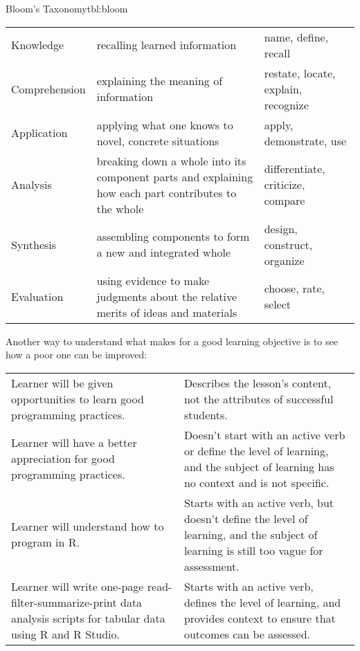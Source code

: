 \begin{tbllbl}{Bloom's Taxonomy}{tbl:bloom}

\begin{tabular}{|l|p{}|p{}|}
Knowledge
& recalling learned information
& name, define, recall
\\

Comprehension
& explaining the meaning of information
& restate, locate, explain, recognize
\\

Application
& applying what one knows to novel, concrete situations
& apply, demonstrate, use
\\

Analysis
& breaking down a whole into its component parts and explaining how each part contributes to the whole
& differentiate, criticize, compare
\\

Synthesis
& assembling components to form a new and integrated whole
& design, construct, organize
\\

Evaluation
& using evidence to make judgments about the relative merits of ideas and materials
& choose, rate, select
\\

\end{tabular}

\end{tbllbl}

Another way to understand what makes for a good learning objective
is to see how a poor one can be improved:

\begin{tabular}{|p{}|p{}|}

Learner will be given opportunities to learn good programming practices.
&
Describes the lesson's content, not the attributes of successful students.
\\

Learner will have a better appreciation for good programming practices.
&
Doesn't start with an active verb or define the level of learning,
and the subject of learning has no context and is not specific.
\\

Learner will understand how to program in R.
&
Starts with an active verb, but doesn't define the level of learning,
and the subject of learning is still too vague for assessment.
\\

Learner will write one-page read-filter-summarize-print data analysis
scripts for tabular data using R and R Studio.
&
Starts with an active verb, defines the level of learning,
and provides context to ensure that outcomes can be assessed.
\\

\end{tabular}

